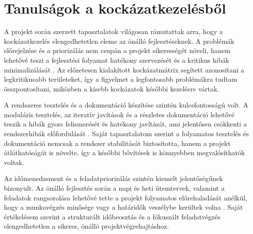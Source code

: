 \section{Tanulságok a kockázatkezelésből}

A projekt során szerzett tapasztalatok világosan rámutattak arra, hogy a kockázatkezelés elengedhetetlen eleme az önálló fejlesztéseknek. 
A problémák előrejelzése és a priorizálás nem csupán a projekt sikerességét növeli, 
hanem lehetővé teszi a fejlesztési folyamat hatékony szervezését és a kritikus hibák minimalizálását \cite{Hajdu2014,Kovacs2016,Szalay2018}. 
Az előzetesen kialakított kockázatmátrix segített azonosítani a legkritikusabb területeket, 
így a figyelmet a legfontosabb problémákra tudtam összpontosítani, miközben a kisebb kockázatok későbbi kezelésre vártak.

A rendszeres tesztelés és a dokumentáció készítése szintén kulcsfontosságú volt. 
A moduláris tesztelés, az iteratív javítások és a 
részletes dokumentáció lehetővé teszik a hibák gyors felismerését és hatékony javítását, 
ami jelentősen csökkenti a rendszerhibák előfordulását \cite{Kaposi2019,Szalay2018}. 
Saját tapasztalatom szerint a folyamatos tesztelés és dokumentáció nemcsak a rendszer 
stabilitását biztosította, hanem a projekt átláthatóságát is növelte, így a későbbi bővítések is könnyebben megvalósíthatók voltak.

Az időmenedzsment és a feladatpriorizálás szintén kiemelt jelentőségűnek bizonyult. 
Az önálló fejlesztés során a napi és heti ütemtervek, valamint a feladatok rangsorolása 
lehetővé tette a projekt folyamatos előrehaladását anélkül, hogy a munkavégzés minősége vagy a határidők veszélybe kerültek volna \cite{Kovacs2016,Hajdu2014}. 
Saját értékelésem szerint a strukturált időbeosztás és a fókuszált feladatvégzés elengedhetetlen a sikeres, önálló projektvégrehajtáshoz.
